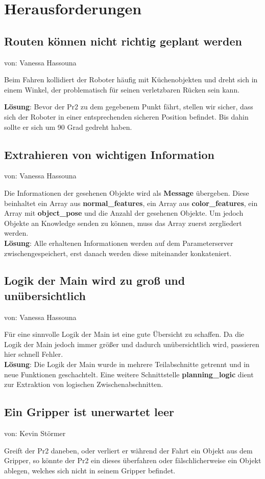 \documentclass{suturo}
\makeatletter
\newcommand{\chapterauthor}[1]{%
  {\parindent0pt\vspace*{-27pt}%
  \linespread{0}\small\begin{flushright}von: #1\end{flushright}%
  \par\nobreak\vspace*{0pt}}
  \@afterheading%
}
\makeatother
\begin{document}
\section{Herausforderungen}
\subsection{Routen können nicht richtig geplant werden}
\chapterauthor{Vanessa Hassouna}
Beim Fahren kollidiert der Roboter häufig mit Küchenobjekten und dreht sich in einem Winkel, der problematisch für seinen verletzbaren Rücken sein kann.

\textbf{Lösung}: Bevor der Pr2 zu dem gegebenem Punkt fährt, stellen wir sicher, dass sich der Roboter in einer entsprechenden sicheren Position befindet. Bis dahin sollte er sich um 90 Grad gedreht haben.

\subsection{Extrahieren von wichtigen Information}
\chapterauthor{Vanessa Hassouna}

Die Informationen der gesehenen Objekte wird als \textbf{Message} übergeben. Diese beinhaltet ein Array aus \textbf{normal\_features}, ein Array aus \textbf{color\_features}, ein Array mit \textbf{object\_pose} und die Anzahl der gesehenen Objekte. 
Um jedoch Objekte an Knowledge senden zu können, muss das Array zuerst zergliedert werden. \\

\textbf{Lösung}: Alle erhaltenen Informationen werden auf dem Parameterserver zwischengespeichert, erst danach werden diese miteinander konkateniert.

\subsection{Logik der Main wird zu groß und unübersichtlich}
\chapterauthor{Vanessa Hassouna}
Für eine sinnvolle Logik der Main ist eine gute Übersicht zu schaffen. Da die Logik der Main jedoch immer größer und dadurch unübersichtlich wird, passieren hier schnell Fehler.\\

\textbf{Lösung}: Die Logik der Main wurde in mehrere Teilabschnitte getrennt und in neue Funktionen geschachtelt. Eine weitere Schnittstelle \textbf{planning\_logic} dient zur Extraktion von logischen Zwischenabschnitten.


\subsection{Ein Gripper ist unerwartet leer}
\chapterauthor{Kevin Störmer}
Greift der Pr2 daneben, oder verliert er während der Fahrt ein Objekt aus dem Gripper, so könnte der Pr2 ein dieses überfahren oder fälschlicherweise ein Objekt ablegen, welches sich nicht in seinem Gripper befindet.\\
\end{document}
